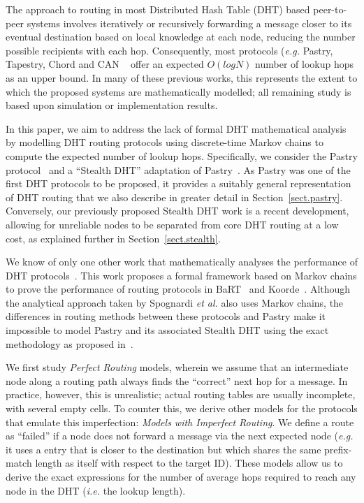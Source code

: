 \documentclass[10pt,twocolumn]{article}
\begin{document}
The approach to routing in most Distributed Hash Table (DHT) based peer-to-peer
systems involves iteratively or recursively forwarding a message closer to its
eventual destination based on local knowledge at each node, reducing the number
possible recipients with each hop. Consequently, most protocols (\emph{e.g.}
Pastry, Tapestry, Chord and CAN ~ \cite{Rowstron01Pastry, Zhao04Tapestry,
Stoica01Chord, Ratnasamy01Scalable}
offer an expected $O(log N)$ number of lookup hops as an upper
bound.
In many of these previous works, this represents the extent to which
the proposed systems are mathematically modelled; all remaining study
is based upon simulation or implementation results.

In this paper, we aim to address the lack of formal DHT mathematical
analysis by modelling DHT  routing protocols using discrete-time
Markov chains to compute the expected number of lookup hops. Specifically, we consider the Pastry
protocol~\cite{Rowstron01Pastry} and a ``Stealth DHT'' adaptation of
Pastry~\cite{Brampton06Stealth}. As Pastry was one of the first DHT
protocols to be proposed, it provides a suitably general
representation of DHT routing that we also describe in greater
detail in Section~\ref{sect.pastry}. Conversely, our previously
proposed Stealth DHT work is a recent development, allowing for
unreliable nodes to be separated from core DHT routing at a low
cost, as explained further in Section~\ref{sect.stealth}.

We know of only one other work that mathematically analyses the performance of
DHT protocols~\cite{Spognardi06Formal}. This work proposes a formal framework
based on Markov chains to prove the performance of routing protocols in
BaRT~\cite{Spognardi02Bart} and Koorde~\cite{Kaashoek03Koorde}.
Although the analytical approach taken by Spognardi \emph{et al.} also uses Markov
chains, the differences in routing methods between these protocols and Pastry
make it impossible to model Pastry and its associated Stealth DHT using the
exact methodology as proposed in~\cite{Spognardi06Formal}.

We first study \emph{Perfect Routing} models, wherein we assume that an
intermediate node along a routing path always finds the ``correct'' next hop
for a message. In practice, however, this is unrealistic; actual routing tables
are usually incomplete, with several empty cells. To counter this, we derive
other models for the protocols that emulate this imperfection: \emph{Models
with Imperfect Routing}. We define a route as ``failed'' if a node does not
forward a message via the next expected node
(\emph{e.g.} it uses a entry that is closer to the destination but which shares
the same prefix-match length as itself with respect to the target ID). These
models allow us to derive the exact expressions for the number of average hops
required to reach any node in the DHT (\emph{i.e.} the lookup length).
\end{document}
